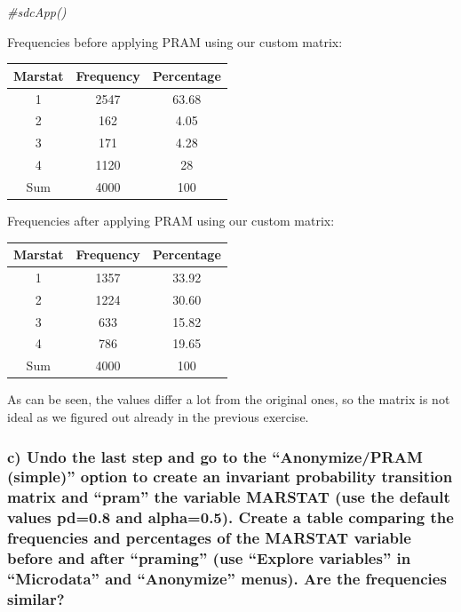 \documentclass[
]{article}
\newenvironment{Shaded}{\begin{snugshade}}{\end{snugshade}}
\newcommand{\CommentTok}[1]{\textcolor[rgb]{0.56,0.35,0.01}{\textit{#1}}}
\begin{document}
\begin{Shaded}
\begin{Highlighting}[]
\CommentTok{\#sdcApp()}
\end{Highlighting}
\end{Shaded}

Frequencies before applying PRAM using our custom matrix:

\begin{longtable}[]{@{}ccc@{}}
\toprule()
Marstat & Frequency & Percentage \\
\midrule()
\endhead
1 & 2547 & 63.68 \\
2 & 162 & 4.05 \\
3 & 171 & 4.28 \\
4 & 1120 & 28 \\
Sum & 4000 & 100 \\
\bottomrule()
\end{longtable}

Frequencies after applying PRAM using our custom matrix:

\begin{longtable}[]{@{}ccc@{}}
\toprule()
Marstat & Frequency & Percentage \\
\midrule()
\endhead
1 & 1357 & 33.92 \\
2 & 1224 & 30.60 \\
3 & 633 & 15.82 \\
4 & 786 & 19.65 \\
Sum & 4000 & 100 \\
\bottomrule()
\end{longtable}

As can be seen, the values differ a lot from the original ones, so the
matrix is not ideal as we figured out already in the previous exercise.

\hypertarget{c-undo-the-last-step-and-go-to-the-anonymizepram-simple-option-to-create-an-invariant-probability-transition-matrix-and-pram-the-variable-marstat-use-the-default-values-pd0.8-and-alpha0.5.-create-a-table-comparing-the-frequencies-and-percentages-of-the-marstat-variable-before-and-after-praming-use-explore-variables-in-microdata-and-anonymize-menus.-are-the-frequencies-similar}{%
\subsubsection{c) Undo the last step and go to the ``Anonymize/PRAM
(simple)'' option to create an invariant probability transition matrix
and ``pram'' the variable MARSTAT (use the default values pd=0.8 and
alpha=0.5). Create a table comparing the frequencies and percentages of
the MARSTAT variable before and after ``praming'' (use ``Explore
variables'' in ``Microdata'' and ``Anonymize'' menus). Are the
frequencies
similar?}\label{c-undo-the-last-step-and-go-to-the-anonymizepram-simple-option-to-create-an-invariant-probability-transition-matrix-and-pram-the-variable-marstat-use-the-default-values-pd0.8-and-alpha0.5.-create-a-table-comparing-the-frequencies-and-percentages-of-the-marstat-variable-before-and-after-praming-use-explore-variables-in-microdata-and-anonymize-menus.-are-the-frequencies-similar}}
\end{document}
